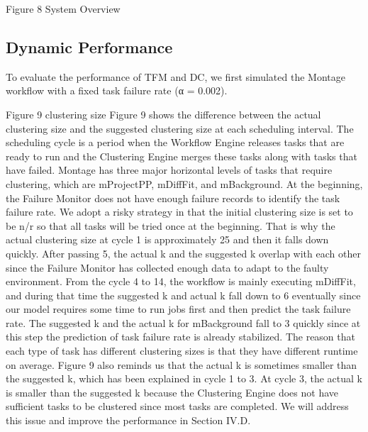 \documentclass{IOS-Book-Article}
\begin{document}
Figure 8	 System Overview
\subsection{Dynamic Performance}
To evaluate the performance of TFM and DC, we first simulated the Montage workflow with a fixed task failure rate (α = 0.002).  
 
Figure 9	clustering size
Figure 9 shows the difference between the actual clustering size and the suggested clustering size at each scheduling interval. The scheduling cycle is a period when the Workflow Engine releases tasks that are ready to run and the Clustering Engine merges these tasks along with tasks that have failed. Montage has three major horizontal levels of tasks that require clustering, which are mProjectPP, mDiffFit, and mBackground. At the beginning, the Failure Monitor does not have enough failure records to identify the task failure rate. We adopt a risky strategy in that the initial clustering size is set to be n/r so that all tasks will be tried once at the beginning. That is why the actual clustering size at cycle 1 is approximately 25 and then it falls down quickly. After passing 5, the actual k and the suggested k overlap with each other since the Failure Monitor has collected enough data to adapt to the faulty environment. From the cycle 4 to 14, the workflow is mainly executing mDiffFit, and during that time the suggested k and actual k fall down to 6 eventually since our model requires some time to run jobs first and then predict the task failure rate. The suggested k and the actual k for mBackground fall to 3 quickly since at this step the prediction of task failure rate is already stabilized. The reason that each type of task has different clustering sizes is that they have different runtime on average. 
  Figure 9 also reminds us that the actual k is sometimes smaller than the suggested k, which has been explained in cycle 1 to 3. At cycle 3, the actual k is smaller than the suggested k because the Clustering Engine does not have sufficient tasks to be clustered since most tasks are completed. We will address this issue and improve the performance in Section IV.D. 
\end{document}
